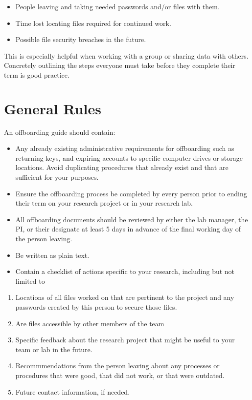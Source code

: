 \documentclass[
]{book}
\providecommand{\tightlist}{%
  \setlength{\itemsep}{0pt}\setlength{\parskip}{0pt}}
\begin{document}
\begin{itemize}
\tightlist
\item
  People leaving and taking needed passwords and/or files with them.
\item
  Time lost locating files required for continued work.
\item
  Possible file security breaches in the future.
\end{itemize}

This is especially helpful when working with a group or sharing data with others. Concretely outlining the steps everyone must take before they complete their term is good practice.

\hypertarget{general-rules-5}{%
\section*{General Rules}\label{general-rules-5}}

An offboarding guide should contain:

\begin{itemize}
\tightlist
\item
  Any already existing administrative requirements for offboarding such as returning keys, and expiring accounts to specific computer drives or storage locations. Avoid duplicating procedures that already exist and that are sufficient for your purposes.
\item
  Ensure the offboarding process be completed by every person prior to ending their term on your research project or in your research lab.
\item
  All offboarding documents should be reviewed by either the lab manager, the PI, or their designate at least 5 days in advance of the final working day of the person leaving.
\item
  Be written as plain text.
\item
  Contain a checklist of actions specific to your research, including but not limited to
\end{itemize}

\begin{enumerate}
\def\labelenumi{\arabic{enumi}.}
\tightlist
\item
  Locations of all files worked on that are pertinent to the project and any passwords created by this person to secure those files.
\item
  Are files accessible by other members of the team
\item
  Specific feedback about the research project that might be useful to your team or lab in the future.
\item
  Recommmendations from the person leaving about any processes or procedures that were good, that did not work, or that were outdated.
\item
  Future contact information, if needed.
\end{enumerate}
\end{document}
